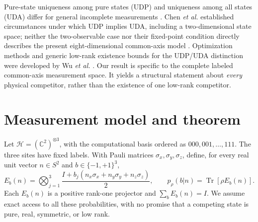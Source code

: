 \documentclass[aps,pra,reprint,onecolumn,superscriptaddress]{revtex4-2}
\newcommand{\Hh}{\mathcal H}
\newcommand{\Tr}{\operatorname{Tr}}
\begin{document}
Pure-state uniqueness among pure states (UDP) and uniqueness among all states (UDA) differ for general incomplete measurements \cite{Chen2013}. Chen \emph{et al.} established circumstances under which UDP implies UDA, including a two-dimensional state space; neither the two-observable case nor their fixed-point condition directly describes the present eight-dimensional common-axis model \cite{Chen2013}. Optimization methods and generic low-rank existence bounds for the UDP/UDA distinction were developed by Wu \emph{et al.} \cite{Wu2025}. Our result is specific to the complete labeled common-axis measurement space. It yields a structural statement about \emph{every} physical competitor, rather than the existence of one low-rank competitor.

\section{Measurement model and theorem}

Let \(\Hh=(\mathbb C^2)^{\otimes3}\), with the computational basis ordered as \(000,001,\ldots,111\). The three sites have fixed labels. With Pauli matrices \(\sigma_x,\sigma_y,\sigma_z\), define, for every real unit vector \(n\in S^2\) and \(b\in\{-1,+1\}^3\),
\begin{equation}
 E_b(n)=\bigotimes_{j=1}^3
 \frac{I+b_j(n_x\sigma_x+n_y\sigma_y+n_z\sigma_z)}{2},
 \qquad p_\rho(b|n)=\Tr[\rho E_b(n)].
 \label{eq:effects}
\end{equation}
Each \(E_b(n)\) is a positive rank-one projector and \(\sum_bE_b(n)=I\). We assume exact access to all these probabilities, with no promise that a competing state is pure, real, symmetric, or low rank.
\end{document}
